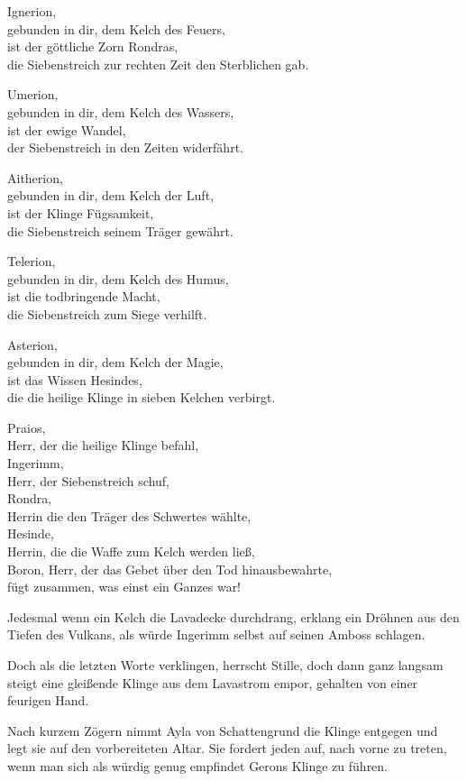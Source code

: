 Ignerion,\\
gebunden in dir, dem Kelch des Feuers,\\
ist der göttliche Zorn Rondras,\\
die Siebenstreich zur rechten Zeit den Sterblichen gab.

Umerion,\\
gebunden in dir, dem Kelch des Wassers,\\
ist der ewige Wandel,\\
der Siebenstreich in den Zeiten widerfährt.

Aitherion,\\
gebunden in dir, dem Kelch der Luft,\\
ist der Klinge Fügsamkeit,\\
die Siebenstreich seinem Träger gewährt.

Telerion,\\
gebunden in dir, dem Kelch des Humus,\\
ist die todbringende Macht,\\
die Siebenstreich zum Siege verhilft.

Asterion,\\
gebunden in dir, dem Kelch der Magie,\\
ist das Wissen Hesindes,\\
die die heilige Klinge in sieben Kelchen verbirgt.

Praios,\\
Herr, der die heilige Klinge befahl,\\
Ingerimm,\\
Herr, der Siebenstreich schuf,\\
Rondra,\\
Herrin die den Träger des Schwertes wählte,\\
Hesinde,\\
Herrin, die die Waffe zum Kelch werden ließ,\\
Boron, Herr, der das Gebet über den Tod hinausbewahrte,\\
fügt zusammen, was einst ein Ganzes war!

Jedesmal wenn ein Kelch die Lavadecke durchdrang, erklang ein Dröhnen aus den Tiefen des Vulkans, als würde Ingerimm selbst auf seinen Amboss schlagen.

Doch als die letzten Worte verklingen, herrscht Stille, doch dann ganz langsam steigt eine gleißende Klinge aus dem Lavastrom empor, gehalten von einer feurigen Hand.

Nach kurzem Zögern nimmt Ayla von Schattengrund die Klinge entgegen und legt sie auf den vorbereiteten Altar.
Sie fordert jeden auf, nach vorne zu treten, wenn man sich als würdig genug empfindet Gerons Klinge zu führen.

